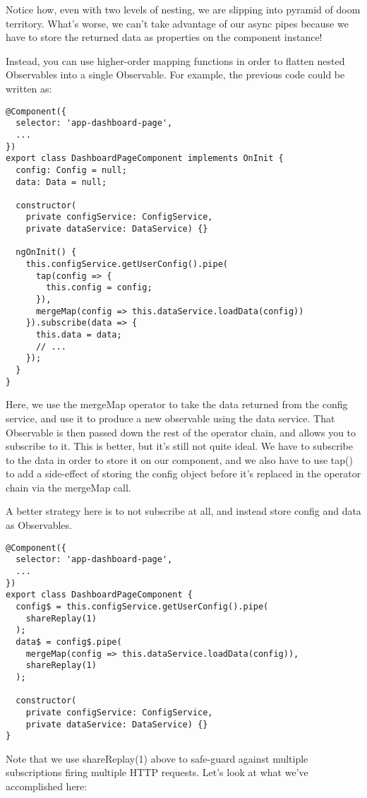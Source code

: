 Notice how, even with two levels of nesting, we are slipping into pyramid of doom territory. What’s worse, we can’t take advantage of our async pipes because we have to store the returned data as properties on the component instance!

Instead, you can use higher-order mapping functions in order to flatten nested Observables into a single Observable. For example, the previous code could be written as: 
\begin{lstlisting}
@Component({
  selector: 'app-dashboard-page',
  ...
})
export class DashboardPageComponent implements OnInit {
  config: Config = null;
  data: Data = null;

  constructor(
    private configService: ConfigService, 
    private dataService: DataService) {}

  ngOnInit() {
    this.configService.getUserConfig().pipe(
      tap(config => {
        this.config = config;
      }),
      mergeMap(config => this.dataService.loadData(config))
    }).subscribe(data => {
      this.data = data;
      // ...
    });
  }
}  
\end{lstlisting}
Here, we use the mergeMap operator to take the data returned from the config service, and use it to produce a new observable using the data service. That Observable is then passed down the rest of the operator chain, and allows you to subscribe to it. This is better, but it’s still not quite ideal. We have to subscribe to the data in order to store it on our component, and we also have to use tap() to add a side-effect of storing the config object before it’s replaced in the operator chain via the mergeMap call.

A better strategy here is to not subscribe at all, and instead store config and data as Observables.

\begin{lstlisting}
@Component({
  selector: 'app-dashboard-page',
  ...
})
export class DashboardPageComponent {
  config$ = this.configService.getUserConfig().pipe(
    shareReplay(1)
  );
  data$ = config$.pipe(
    mergeMap(config => this.dataService.loadData(config)),
    shareReplay(1)
  );

  constructor(
    private configService: ConfigService, 
    private dataService: DataService) {}
}  
\end{lstlisting}

Note that we use shareReplay(1) above to safe-guard against multiple subscriptions firing multiple HTTP requests.
Let’s look at what we’ve accomplished here:

